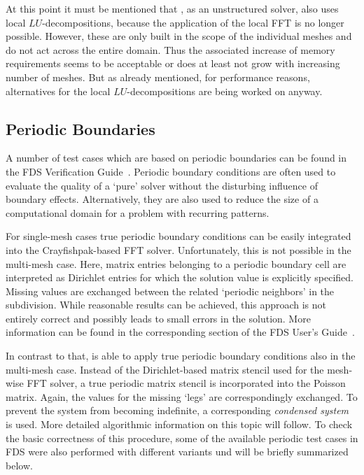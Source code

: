 At this point it must be mentioned that \uscarc{},  as an unstructured solver, also uses local $LU$-decompositions, because the application of the local FFT is no longer possible.
However, these are only built in the scope of the individual meshes and do not act across the entire domain. Thus the associated increase of memory requirements seems to be acceptable or does at least not grow with increasing number of meshes.
But as already mentioned, for performance reasons, alternatives for the local $LU$-decompositions are being worked on anyway.


\subsection{Periodic Boundaries}
\label{SEC_SCARC_periodic_boundaries}

A number of test cases which are based on periodic boundaries can be found in the FDS Verification Guide~\cite{McGrattan:2018:VG}. Periodic boundary conditions are often used to evaluate the quality of a `pure' solver without the disturbing influence of boundary effects. Alternatively, they are also used to reduce the size of a computational domain for a problem with recurring patterns.

For single-mesh cases true periodic boundary conditions can be easily integrated into the Crayfishpak-based FFT solver. Unfortunately, this is not possible in the multi-mesh case. Here, matrix entries belonging to a periodic boundary cell are interpreted as Dirichlet entries for which the solution value is explicitly specified. Missing values are exchanged between the related `periodic neighbors' in the subdivision. While reasonable results can be achieved, this approach is not entirely correct and possibly leads to small errors in the solution. More information can be found in the corresponding section of the FDS User's Guide~\cite{McGrattan:2018:UG}.

In contrast to that, \scarc{} is able to apply true periodic boundary conditions also in the multi-mesh case. Instead of the Dirichlet-based matrix stencil used for the mesh-wise FFT solver, a true periodic matrix stencil is incorporated into the Poisson matrix. Again, the values for the missing `legs' 
are correspondingly exchanged. 
To prevent the system from becoming indefinite, a corresponding {\it condensed system} is used. More detailed algorithmic information on this topic will follow.
To check the basic correctness of this procedure, some of the available periodic test cases in FDS were also performed with different \scarc{} variants und will be briefly summarized below.


